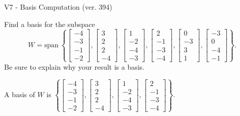 \begin{exercise}
  \begin{exerciseTitle}V7 - Basis Computation (ver. 394)\end{exerciseTitle}
  \begin{exerciseStatement}
    Find a basis for the subspace 
\[W=\mathrm{span}\ \left\{\left[\begin{array}{r}
-4 \\
-3 \\
-1 \\
-2
\end{array}\right] , \left[\begin{array}{r}
3 \\
2 \\
2 \\
-4
\end{array}\right] , \left[\begin{array}{r}
1 \\
-2 \\
-4 \\
-3
\end{array}\right] , \left[\begin{array}{r}
2 \\
-1 \\
-3 \\
-4
\end{array}\right] , \left[\begin{array}{r}
0 \\
-3 \\
3 \\
1
\end{array}\right] , \left[\begin{array}{r}
-3 \\
0 \\
-4 \\
-1
\end{array}\right]\right\}.\]
 Be sure to explain why your result is a basis.


  \end{exerciseStatement}
  \begin{exerciseAnswer}
   A basis of \(W\) is  \(\left\{\left[\begin{array}{r}
-4 \\
-3 \\
-1 \\
-2
\end{array}\right] , \left[\begin{array}{r}
3 \\
2 \\
2 \\
-4
\end{array}\right] , \left[\begin{array}{r}
1 \\
-2 \\
-4 \\
-3
\end{array}\right] , \left[\begin{array}{r}
2 \\
-1 \\
-3 \\
-4
\end{array}\right]\right\}\).
  


  \end{exerciseAnswer}
\end{exercise}